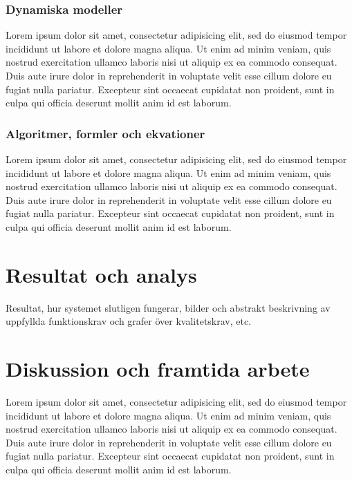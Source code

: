 \documentclass[a4paper,12pt,oneside,final]{extbook}
\begin{document}
\subsection{Dynamiska modeller}

Lorem ipsum dolor sit amet, consectetur adipisicing elit, sed do eiusmod tempor incididunt ut labore et dolore magna aliqua. Ut enim ad minim veniam, quis nostrud exercitation ullamco laboris nisi ut aliquip ex ea commodo consequat. Duis aute irure dolor in reprehenderit in voluptate velit esse cillum dolore eu fugiat nulla pariatur. Excepteur sint occaecat cupidatat non proident, sunt in culpa qui officia deserunt mollit anim id est laborum.

\subsection{Algoritmer, formler och ekvationer}

Lorem ipsum dolor sit amet, consectetur adipisicing elit, sed do eiusmod tempor incididunt ut labore et dolore magna aliqua. Ut enim ad minim veniam, quis nostrud exercitation ullamco laboris nisi ut aliquip ex ea commodo consequat. Duis aute irure dolor in reprehenderit in voluptate velit esse cillum dolore eu fugiat nulla pariatur. Excepteur sint occaecat cupidatat non proident, sunt in culpa qui officia deserunt mollit anim id est laborum.

\chapter{Resultat och analys}

Resultat, hur systemet slutligen fungerar, bilder och abstrakt beskrivning av uppfyllda funktionskrav och grafer över kvalitetskrav, etc.

\chapter{Diskussion och framtida arbete}

Lorem ipsum dolor sit amet, consectetur adipisicing elit, sed do eiusmod tempor incididunt ut labore et dolore magna aliqua. Ut enim ad minim veniam, quis nostrud exercitation ullamco laboris nisi ut aliquip ex ea commodo consequat. Duis aute irure dolor in reprehenderit in voluptate velit esse cillum dolore eu fugiat nulla pariatur. Excepteur sint occaecat cupidatat non proident, sunt in culpa qui officia deserunt mollit anim id est laborum.
\end{document}

